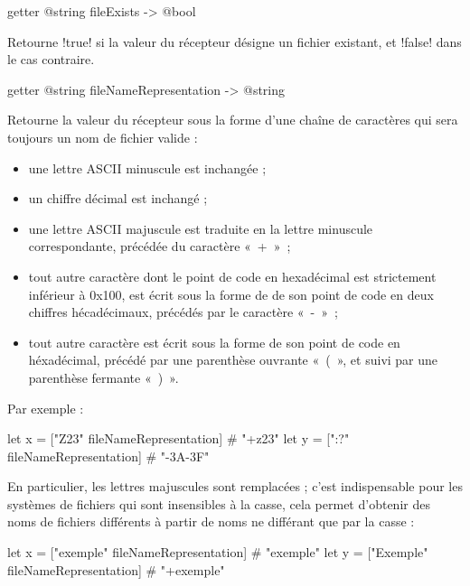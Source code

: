 
\begin{galgas3box}
getter @string fileExists -> @bool
\end{galgas3box}

Retourne \ggst!true! si la valeur du récepteur désigne un fichier existant, et \ggst!false! dans le cas contraire.







\begin{galgas3box}
getter @string fileNameRepresentation -> @string
\end{galgas3box}

Retourne la valeur du récepteur sous la forme d'une chaîne de caractères qui sera toujours un nom de fichier valide :
\begin{itemize}
\item une lettre ASCII minuscule est inchangée ;
\item un chiffre décimal est inchangé ;
\item une lettre ASCII majuscule est traduite en la lettre minuscule correspondante, précédée du caractère «~+~»~;
\item tout autre caractère dont le point de code en hexadécimal est strictement inférieur à 0x100, est écrit sous la forme de de son point de code en deux chiffres hécadécimaux, précédés par le caractère «~-~»~;
\item tout autre caractère est écrit sous la forme de son point de code en héxadécimal, précédé par une parenthèse ouvrante «~(~», et suivi par une parenthèse fermante «~)~».
\end{itemize}

Par exemple :
\begin{galgas3}
let x = ["Z23" fileNameRepresentation] # "+z23"
let y = [":?" fileNameRepresentation] # "-3A-3F"
\end{galgas3}

En particulier, les lettres majuscules sont remplacées ; c'est indispensable pour les systèmes de fichiers qui sont insensibles à la casse, cela permet d'obtenir des noms de fichiers différents à partir de noms ne différant que par la casse :

\begin{galgas3}
let x = ["exemple" fileNameRepresentation] # "exemple"
let y = ["Exemple" fileNameRepresentation] # "+exemple"
\end{galgas3}






